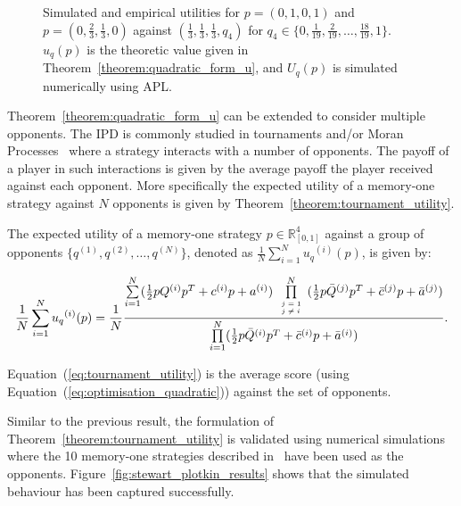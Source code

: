 \begin{figure}[!htbp]
\begin{center}
\begin{subfigure}{0.5\textwidth}
        \end{subfigure}
    \end{center}
    \caption{Simulated and empirical utilities for \(p = (0, 1, 0, 1)\)
    and \(p = (0, \frac{2}{3}, \frac{1}{3}, 0)\) against \((\frac{1}{3}, \frac{1}{3}, \frac{1}{3}, q_4)\) for
    \(q_4 \in \{0,  \frac{1}{19}, \frac{2}{19}, \dots, \frac{18}{19}, 1\}\).
    \(u_q(p)\) is the theoretic value given in Theorem~\ref{theorem:quadratic_form_u},
    and \(U_q(p)\) is simulated numerically using APL.}
    \label{fig:analytical_simulated}
\end{figure}

Theorem~\ref{theorem:quadratic_form_u} can be extended to consider multiple
opponents. The IPD is commonly studied in tournaments and/or Moran Processes~\cite{Kaiping2014}
where a strategy interacts with a number of opponents. The payoff of a player in
such interactions is given by the average payoff the player received against
each opponent. More specifically the expected utility of a memory-one strategy
against \(N\) opponents is given by Theorem~\ref{theorem:tournament_utility}.

\begin{theorem}\label{theorem:tournament_utility}
    The expected utility of a memory-one strategy \(p\in\mathbb{R}_{[0,1]}^4\)
    against a group of opponents \(\{q^{(1)}, q^{(2)}, \dots, q^{(N)}\}\), denoted
    as \(\frac{1}{N} \sum\limits_{i=1} ^ {N} {u_q}^{(i)} (p)\), is given by:

    \begin{equation}\label{eq:tournament_utility}
        \frac{1}{N} \sum\limits_{i=1} ^ {N} {u_q}^{(i)} (p) = \frac{1}{N}
        \frac{\sum\limits_{i=1} ^ {N} (\frac{1}{2} pQ^{(i)} p^T + c^{(i)} p + a^ {(i)})
        \prod\limits_{\tiny\begin{array}{l} j=1 \\ j \neq i \end{array}} ^
        N (\frac{1}{2} p\bar{Q}^{(j)} p^T + \bar{c}^{(j)} p + \bar{a}^ {(j)})}
        {\prod\limits_{i=1} ^ N (\frac{1}{2} p\bar{Q}^{(i)} p^T + \bar{c}^{(i)} p + \bar{a}^ {(i)})}.
    \end{equation}
\end{theorem}

Equation~(\ref{eq:tournament_utility}) is the average score
(using Equation~(\ref{eq:optimisation_quadratic})) against the set of opponents.

Similar to the previous result, the formulation of
Theorem~\ref{theorem:tournament_utility} is validated using numerical
simulations where the 10 memory-one strategies described in~\cite{Stewart2012}
have been used as the opponents. Figure~\ref{fig:stewart_plotkin_results} shows
that the simulated behaviour has been captured successfully.

